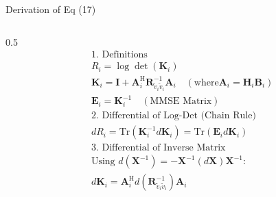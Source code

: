 \documentclass[aspectratio=169, 10pt]{beamer}
\begin{document}
\begin{frame}{Derivation of Eq (17)}

    \begin{columns}
        \begin{column}{0.5\paperwidth}
            \begin{align*}
                 & \text{1. Definitions}                                                                                                                                                                                    \\
                 & R_i = \log \det (\mathbf{K}_i)                                                                                                                                                                           \\
                 & \mathbf{K}_i = \mathbf{I} + \mathbf{A}_i^\mathrm{H} \mathbf{R}_{\tilde{v}_i\tilde{v}_i}^{-1} \mathbf{A}_i \quad (\mathrm{where } \mathbf{A}_i = \mathbf{H}_i \mathbf{B}_i)                               \\
                 & \mathbf{E}_i = \mathbf{K}_i^{-1} \quad (\textrm{MMSE Matrix})                                                                                                                                            \\[1.2em]
                 & \text{2. Differential of Log-Det (Chain Rule)}                                                                                                                                                           \\
                 & d R_i = \mathrm{Tr}(\mathbf{K}_i^{-1} d\mathbf{K}_i) = \mathrm{Tr}(\mathbf{E}_i d\mathbf{K}_i)                                                                                                           \\[1.2em]
                 & \text{3. Differential of Inverse Matrix}                                                                                                                                                                 \\
                 & \textrm{Using } d(\mathbf{X}^{-1}) = -\mathbf{X}^{-1} (d\mathbf{X}) \mathbf{X}^{-1}:                                                                                                                     \\
                 & d\mathbf{K}_i = \mathbf{A}_i^\mathrm{H} d(\mathbf{R}_{\tilde{v}_i\tilde{v}_i}^{-1}) \mathbf{A}_i                                                                                                         \\

\end{align*}
\end{column}
\end{columns}
\end{frame}
\end{document}
